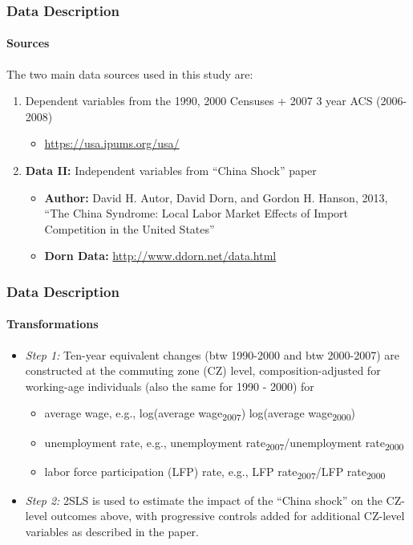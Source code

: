 \begin{frame}
    \frametitle{Data Description}
    \framesubtitle{Sources}
    The two main data sources used in this study are:
    \begin{enumerate}
        \item Dependent variables from the 1990, 2000 Censuses + 2007 3 year ACS (2006-2008)
        \begin{itemize}
            \item \url{https://usa.ipums.org/usa/}
        \end{itemize}
        \item \textbf{Data II:} Independent variables from “China Shock” paper
        \begin{itemize}
            \item \textbf{Author:} David H. Autor, David Dorn, and Gordon H. Hanson, 2013, “The China Syndrome: Local Labor Market Effects of Import Competition in the United States”
            \item \textbf{Dorn Data:} \url{http://www.ddorn.net/data.html}
        \end{itemize}
    \end{enumerate}
\end{frame}
\begin{frame}
    \frametitle{Data Description}
    \framesubtitle{Transformations}
    \begin{itemize}
        \item \textit{Step 1:} Ten-year equivalent changes (btw 1990-2000 and btw 2000-2007) are constructed at the commuting zone (CZ) level, composition-adjusted for working-age individuals (also the same for 1990 - 2000) for
        \begin{itemize}
            \item average wage, e.g., log(average wage\textsubscript{2007}) log(average wage\textsubscript{2000})
            \item unemployment rate, e.g., unemployment rate\textsubscript{2007}/unemployment rate\textsubscript{2000}
            \item labor force participation (LFP) rate, e.g., LFP rate\textsubscript{2007}/LFP rate\textsubscript{2000}
        \end{itemize}
        \item \textit{Step 2:} 2SLS is used to estimate the impact of the “China shock” on the CZ-level outcomes above, with progressive controls added for additional CZ-level variables as described in the paper.
    \end{itemize}
\end{frame}



